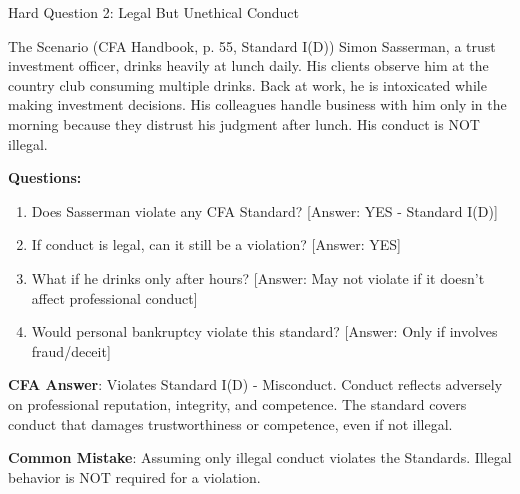 \documentclass{beamer}
\begin{document}
	\begin{frame}{Hard Question 2: Legal But Unethical Conduct}
		\begin{block}{The Scenario (CFA Handbook, p. 55, Standard I(D))}
			Simon Sasserman, a trust investment officer, drinks heavily at lunch daily. His clients observe him at the country club consuming multiple drinks. Back at work, he is intoxicated while making investment decisions. His colleagues handle business with him only in the morning because they distrust his judgment after lunch. His conduct is NOT illegal.
		\end{block}
		
		\vspace{0.2cm}
		\textbf{Questions:}
		\begin{enumerate}
			\item Does Sasserman violate any CFA Standard? \textcolor{cfared}{[Answer: YES - Standard I(D)]}
			\item If conduct is legal, can it still be a violation? \textcolor{cfared}{[Answer: YES]}
			\item What if he drinks only after hours? \textcolor{cfared}{[Answer: May not violate if it doesn't affect professional conduct]}
			\item Would personal bankruptcy violate this standard? \textcolor{cfared}{[Answer: Only if involves fraud/deceit]}
		\end{enumerate}
		
		\vspace{0.2cm}
		\textcolor{cfablue}{\textbf{CFA Answer}}: Violates Standard I(D) - Misconduct. Conduct reflects adversely on professional reputation, integrity, and competence. The standard covers conduct that damages trustworthiness or competence, even if not illegal.
		
		\vspace{0.1cm}
		\textcolor{cfared}{\textbf{Common Mistake}}: Assuming only illegal conduct violates the Standards. Illegal behavior is NOT required for a violation.
	\end{frame}
	
\end{document}
